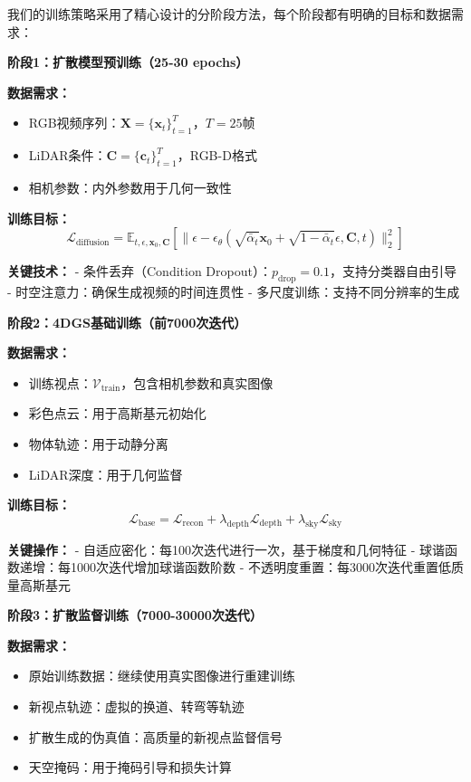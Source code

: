 我们的训练策略采用了精心设计的分阶段方法，每个阶段都有明确的目标和数据需求：

\textbf{阶段1：扩散模型预训练（25-30 epochs）}

\textbf{数据需求：}
\begin{itemize}
\item RGB视频序列：$\mathbf{X} = \{\mathbf{x}_t\}_{t=1}^{T}$，$T=25$帧
\item LiDAR条件：$\mathbf{C} = \{\mathbf{c}_t\}_{t=1}^{T}$，RGB-D格式
\item 相机参数：内外参数用于几何一致性
\end{itemize}

\textbf{训练目标：}
\begin{equation}
\mathcal{L}_{\text{diffusion}} = \mathbb{E}_{t,\epsilon,\mathbf{x}_0,\mathbf{C}} \left[ \|\epsilon - \epsilon_\theta(\sqrt{\bar{\alpha}_t} \mathbf{x}_0 + \sqrt{1-\bar{\alpha}_t} \epsilon, \mathbf{C}, t)\|_2^2 \right]
\label{eq:diffusion_pretraining}
\end{equation}

\textbf{关键技术：}
- 条件丢弃（Condition Dropout）：$p_{\text{drop}} = 0.1$，支持分类器自由引导
- 时空注意力：确保生成视频的时间连贯性
- 多尺度训练：支持不同分辨率的生成

\textbf{阶段2：4DGS基础训练（前7000次迭代）}

\textbf{数据需求：}
\begin{itemize}
\item 训练视点：$\mathcal{V}_{\text{train}}$，包含相机参数和真实图像
\item 彩色点云：用于高斯基元初始化
\item 物体轨迹：用于动静分离
\item LiDAR深度：用于几何监督
\end{itemize}

\textbf{训练目标：}
\begin{equation}
\mathcal{L}_{\text{base}} = \mathcal{L}_{\text{recon}} + \lambda_{\text{depth}} \mathcal{L}_{\text{depth}} + \lambda_{\text{sky}} \mathcal{L}_{\text{sky}}
\label{eq:base_training}
\end{equation}

\textbf{关键操作：}
- 自适应密化：每100次迭代进行一次，基于梯度和几何特征
- 球谐函数递增：每1000次迭代增加球谐函数阶数
- 不透明度重置：每3000次迭代重置低质量高斯基元

\textbf{阶段3：扩散监督训练（7000-30000次迭代）}

\textbf{数据需求：}
\begin{itemize}
\item 原始训练数据：继续使用真实图像进行重建训练
\item 新视点轨迹：虚拟的换道、转弯等轨迹
\item 扩散生成的伪真值：高质量的新视点监督信号
\item 天空掩码：用于掩码引导和损失计算
\end{itemize}

